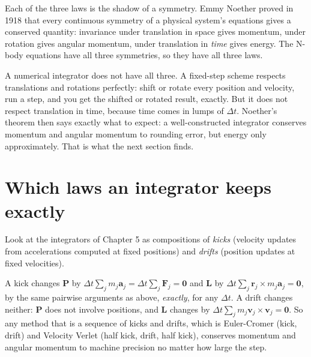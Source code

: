 \documentclass[
  10.5pt,
  letterpaper,
]{scrbook}
\theoremstyle{plain}
\theoremstyle{remark}
\begin{document}
\begin{tcolorbox}[enhanced jigsaw, arc=.35mm, bottomrule=.15mm, bottomtitle=1mm, breakable, colback=white, colbacktitle=quarto-callout-note-color!10!white, colframe=quarto-callout-note-color-frame, coltitle=black, left=2mm, leftrule=.75mm, opacityback=0, opacitybacktitle=0.6, rightrule=.15mm, title={Where it comes from}, titlerule=0mm, toprule=.15mm, toptitle=1mm]

Each of the three laws is the shadow of a symmetry. Emmy Noether proved
in 1918 that every continuous symmetry of a physical system's equations
gives a conserved quantity: invariance under translation in space gives
momentum, under rotation gives angular momentum, under translation in
\emph{time} gives energy. The N-body equations have all three
symmetries, so they have all three laws.

A numerical integrator does not have all three. A fixed-step scheme
respects translations and rotations perfectly: shift or rotate every
position and velocity, run a step, and you get the shifted or rotated
result, exactly. But it does not respect translation in time, because
time comes in lumps of \(\Delta t\). Noether's theorem then says exactly
what to expect: a well-constructed integrator conserves momentum and
angular momentum to rounding error, but energy only approximately. That
is what the next section finds.

\end{tcolorbox}

\section{Which laws an integrator keeps
exactly}\label{which-laws-an-integrator-keeps-exactly}

Look at the integrators of Chapter 5 as compositions of \emph{kicks}
(velocity updates from accelerations computed at fixed positions) and
\emph{drifts} (position updates at fixed velocities).

A kick changes \(\mathbf{P}\) by
\(\Delta t\sum_j m_j\mathbf{a}_j = \Delta t\sum_j\mathbf{F}_j = \mathbf{0}\)
and \(\mathbf{L}\) by
\(\Delta t\sum_j\mathbf{r}_j\times m_j\mathbf{a}_j = \mathbf{0}\), by
the same pairwise arguments as above, \emph{exactly}, for any
\(\Delta t\). A drift changes neither: \(\mathbf{P}\) does not involve
positions, and \(\mathbf{L}\) changes by
\(\Delta t\sum_j m_j\mathbf{v}_j\times\mathbf{v}_j = \mathbf{0}\). So
any method that is a sequence of kicks and drifts, which is Euler-Cromer
(kick, drift) and Velocity Verlet (half kick, drift, half kick),
conserves momentum and angular momentum to machine precision no matter
how large the step.
\end{document}
